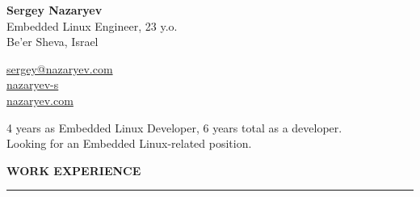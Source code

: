 \documentclass[hidelinks]{resume} %
\begin{document}
\begin{minipage}[t]{0.78\textwidth}
{\Huge \textbf{Sergey Nazaryev}}\vspace{2mm}\\
{Embedded Linux Engineer, 23 y.o.}\\
{Be'er Sheva, Israel \vspace{2mm}}\\

\end{minipage}
\begin{minipage}[t]{0.82\textwidth}
\vspace{-5mm}
{\small \faEnvelopeO} {\small \href{mailto:sergey@nazaryev.com}{sergey@nazaryev.com}}\\
{\small \faLinkedin} {\small \href{https://www.linkedin.com/in/nazaryev-s/}{nazaryev-s}}\\
{\small \faLink} {\small \href{https://nazaryev.com}{nazaryev.com}}
\end{minipage} \vspace{-7mm}

{\small
4 years as Embedded Linux Developer, 6 years total as a developer.\\
Looking for an Embedded Linux-related position.
}


\sectionskip
\MakeUppercase{\bf Work experience}
\sectionlineskip
\hrule
\end{document}
